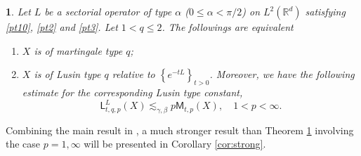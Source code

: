 \documentclass[oneside,english,a4wide]{amsart}
\numberwithin{equation}{section}
\numberwithin{figure}{section}
\theoremstyle{plain}
\newtheorem{thm}{\protect\theoremname}[section]
\theoremstyle{plain}
\newtheorem{corollary}[thm]{Corollary}
\theoremstyle{definition}
\theoremstyle{plain}
\theoremstyle{remark}
\theoremstyle{definition}
\theoremstyle{remark}
\theoremstyle{definition}
\providecommand{\theoremname}{Theorem}
\newcommand{\real}{{\mathbb R}}
\newcommand{\8}{+\infty}
\renewcommand{\1}{\mathbbm{1}}
\newcommand\lk[1]{ \left\{ #1 \right\} }
\begin{document}
\begin{thm}\label{cor}
Let $L$ be a sectorial operator of type $\alpha$ ($0 \leq \alpha < \pi/2$) on $L^2(\real^d)$ satisfying \eqref{pt10}, \eqref{pt2} and \eqref{pt3}. Let $1 < q \leq2$. The followings are equivalent
    \begin{enumerate}[{\rm (i)}]
        \item $X$ is of martingale type $q$;
     
        \item $X$ is of Lusin type $q$ relative to $\lk{e^{-tL}}_{t > 0}$. Moreover, we have the following estimate for the corresponding Lusin type constant, 
        \[
            \mathsf{L}^L_{t, q, p}(X) \lesssim_{\gamma, \beta} p \mathsf{M}_{t, p}(X), \quad 1 < p < \infty.
        \]
    \end{enumerate} 
    \end{thm}

Combining the main result in \cite{Ouyang2010}, a much stronger result than Theorem \ref{cor} involving the case $p=1,\infty$ will be presented in Corollary \ref{cor:strong}.






 
\end{document}
